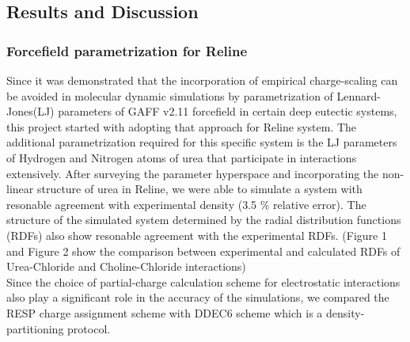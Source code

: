\subsection*{Results and Discussion}
\subsubsection*{Forcefield parametrization for Reline}
Since it was demonstrated that the incorporation of empirical charge-scaling can be avoided in molecular dynamic simulations by parametrization of Lennard-Jones(LJ) parameters of GAFF v2.11 forcefield in certain deep eutectic systems, this project started with adopting that approach for Reline system.
The additional parametrization required for this specific system is the LJ parameters of Hydrogen and Nitrogen atoms of urea that participate in interactions extensively. After surveying the parameter hyperspace and incorporating the non-linear structure of urea in Reline, we were able to simulate a system with resonable agreement with experimental density (3.5 $\%$ relative error). The structure of the simulated system determined by the radial distribution functions (RDFs) also show resonable agreement with the experimental RDFs. (Figure 1 and Figure 2 show the comparison between experimental and calculated RDFs of Urea-Chloride and Choline-Chloride interactions)
\\
Since the choice of partial-charge calculation scheme for electrostatic interactions also play a significant role in the accuracy of the simulations, we compared the RESP charge assignment scheme with DDEC6 scheme which is a density-partitioning protocol.

